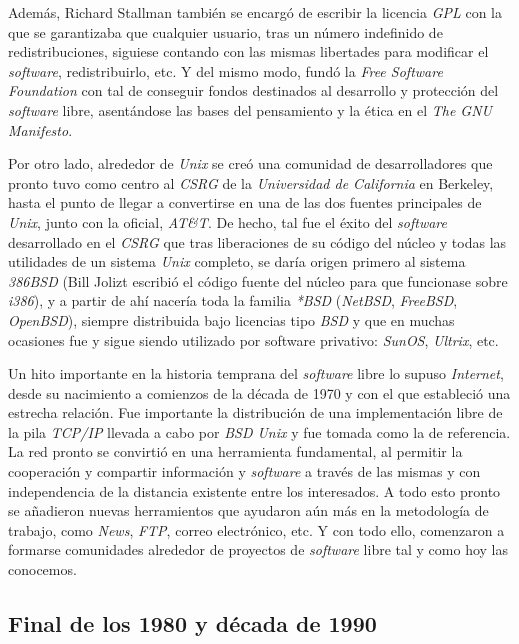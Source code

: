 Además, Richard Stallman también se encargó de escribir la licencia \textit{GPL}
con la que se garantizaba que cualquier usuario, tras un número indefinido de
redistribuciones, siguiese contando con las mismas libertades para modificar el
\textit{software}, redistribuirlo, etc. Y del mismo modo, fundó la \textit{Free
Software Foundation} con tal de conseguir fondos destinados al desarrollo y
protección del \textit{software} libre, asentándose las bases del pensamiento y
la ética en el \textit{The GNU Manifesto}.

Por otro lado, alrededor de \textit{Unix} se creó una comunidad de
desarrolladores que pronto tuvo como centro al \textit{CSRG} de la
\textit{Universidad de California} en Berkeley, hasta el punto de llegar a
convertirse en una de las dos fuentes principales de \textit{Unix}, junto con la
oficial, \textit{AT\&T}. De hecho, tal fue el éxito del \textit{software}
desarrollado en el \textit{CSRG} que tras liberaciones de su código del núcleo y
todas las utilidades de un sistema \textit{Unix} completo, se daría origen
primero al sistema \textit{386BSD} (Bill Jolizt escribió el código fuente del
núcleo para que funcionase sobre \textit{i386}), y a partir de ahí nacería toda
la familia \textit{*BSD} (\textit{NetBSD}, \textit{FreeBSD}, \textit{OpenBSD}),
siempre distribuida bajo licencias tipo \textit{BSD} y que en muchas ocasiones
fue y sigue siendo utilizado por software privativo: \textit{SunOS},
\textit{Ultrix}, etc.

Un hito importante en la historia temprana del \textit{software} libre lo supuso
\textit{Internet}, desde su nacimiento a comienzos de la década de 1970 y con el
que estableció una estrecha relación. Fue importante la distribución de una
implementación libre de la pila \textit{TCP/IP} llevada a cabo por \textit{BSD
Unix} y fue tomada como la de referencia. La red pronto se convirtió en una
herramienta fundamental, al permitir la cooperación y compartir información y
\textit{software} a través de las mismas y con independencia de la distancia
existente entre los interesados. A todo esto pronto se añadieron nuevas
herramientos que ayudaron aún más en la metodología de trabajo, como
\textit{News}, \textit{FTP}, correo electrónico, etc. Y con todo ello,
comenzaron a formarse comunidades alrededor de proyectos de \textit{software}
libre tal y como hoy las conocemos.

\subsection{Final de los 1980 y década de 1990}

